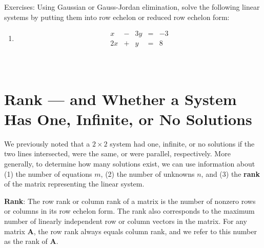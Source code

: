 \documentclass[]{book}
\theoremstyle{definition}
\theoremstyle{definition}
\theoremstyle{definition}
\theoremstyle{remark}
\begin{document}
Exercises: Using Gaussian or Gauss-Jordan elimination, solve the
following linear systems by putting them into row echelon or reduced row
echelon form:

\begin{enumerate}
        \item  $$\begin{matrix}
            x  & - & 3y & = & -3\\
            2x & + &  y & = &  8
            \end{matrix}$$\\
            \phantom{$\begin{matrix}
            x  & - & 3y & = & -3\\
               &   & 7y & = & 14\\          
            \end{matrix}$}
            \phantom{$\begin{matrix}
            x  & - & 3y & = & -3\\
               &   & y & = & 2\\            
            \end{matrix}$}\\
            \phantom{$\begin{matrix}
            x & = & 3\\
            y & = & 2\\         
            \end{matrix}$}
        \bigskip

            
\end{enumerate}

\section{Rank --- and Whether a System Has One, Infinite, or No
Solutions}\label{rank-and-whether-a-system-has-one-infinite-or-no-solutions}

We previously noted that a \(2\times 2\) system had one, infinite, or no
solutions if the two lines intersected, were the same, or were parallel,
respectively. More generally, to determine how many solutions exist, we
can use information about (1) the number of equations \(m\), (2) the
number of unknowns \(n\), and (3) the \textbf{rank} of the matrix
representing the linear system.

\textbf{Rank}: The row rank or column rank of a matrix is the number of
nonzero rows or columns in its row echelon form. The rank also
corresponds to the maximum number of linearly independent row or column
vectors in the matrix. For any matrix \textbf{A}, the row rank always
equals column rank, and we refer to this number as the rank of
\textbf{A}.
\end{document}
